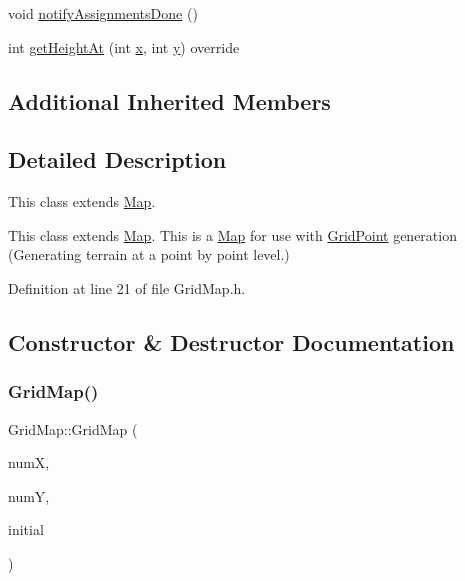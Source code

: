 \begin{DoxyCompactItemize}
\item 
void \mbox{\hyperlink{class_world_architect_1_1_grid_map_ac3ccd253b5ab9e734df8286399241ea1}{notify\+Assignments\+Done}} ()
\item 
int \mbox{\hyperlink{class_world_architect_1_1_grid_map_a00b9a9b88ebb3272a1cd2438d1c558ab}{get\+Height\+At}} (int \mbox{\hyperlink{class_world_architect_1_1_map_a1b4cf9200dca11577b4567584a1e62b8}{x}}, int \mbox{\hyperlink{class_world_architect_1_1_map_abd1e160bb8b03587caac4fb508c13307}{y}}) override
\end{DoxyCompactItemize}
\subsection*{Additional Inherited Members}


\subsection{Detailed Description}
This class extends \mbox{\hyperlink{class_world_architect_1_1_map}{Map}}. 

This class extends \mbox{\hyperlink{class_world_architect_1_1_map}{Map}}. This is a \mbox{\hyperlink{class_world_architect_1_1_map}{Map}} for use with \mbox{\hyperlink{struct_world_architect_1_1_grid_point}{Grid\+Point}} generation (Generating terrain at a point by point level.) 

Definition at line 21 of file Grid\+Map.\+h.



\subsection{Constructor \& Destructor Documentation}
\mbox{\label{class_world_architect_1_1_grid_map_a2641cc9e0438e74c3f43cf85a92d6d55}} 
\subsubsection{\texorpdfstring{GridMap()}{GridMap()}}
{\footnotesize\ttfamily Grid\+Map\+::\+Grid\+Map (\begin{DoxyParamCaption}\item[{int}]{numX,  }\item[{int}]{numY,  }\item[{\mbox{\hyperlink{struct_world_architect_1_1_grid_point}{Grid\+Point}} $\ast$}]{initial }\end{DoxyParamCaption})}



